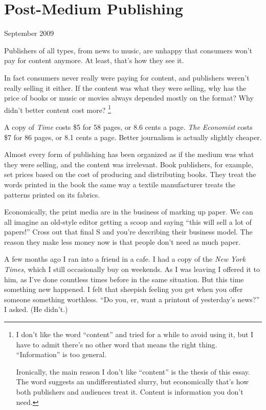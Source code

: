 \chapter{Post-Medium Publishing}

September 2009

Publishers of all types, from news to music, are unhappy that consumers
won't pay for content anymore. At least, that's how they see it.

In fact consumers never really were paying for content, and publishers
weren't really selling it either. If the content was what they were
selling, why has the price of books or music or movies always depended
mostly on the format? Why didn't better content cost more?
\footnote{I don't like the word ``content'' and tried for a while to avoid
using it, but I have to admit there's no other word that means the right
thing. ``Information'' is too general.

Ironically, the main reason I don't like ``content'' is the thesis of
this essay. The word suggests an undifferentiated slurry, but
economically that's how both publishers and audiences treat it. Content
is information you don't need.}

A copy of \emph{Time} costs \$5 for 58 pages, or 8.6 cents a page.
\emph{The Economist} costs \$7 for 86 pages, or 8.1 cents a page. Better
journalism is actually slightly cheaper.

Almost every form of publishing has been organized as if the medium was
what they were selling, and the content was irrelevant. Book publishers,
for example, set prices based on the cost of producing and distributing
books. They treat the words printed in the book the same way a textile
manufacturer treats the patterns printed on its fabrics.

Economically, the print media are in the business of marking up paper.
We can all imagine an old-style editor getting a scoop and saying ``this
will sell a lot of papers!'' Cross out that final S and you're
describing their business model. The reason they make less money now is
that people don't need as much paper.

A few months ago I ran into a friend in a cafe. I had a copy of the
\emph{New York Times}, which I still occasionally buy on weekends. As I
was leaving I offered it to him, as I've done countless times before in
the same situation. But this time something new happened. I felt that
sheepish feeling you get when you offer someone something worthless.
``Do you, er, want a printout of yesterday's news?'' I asked. (He
didn't.)

